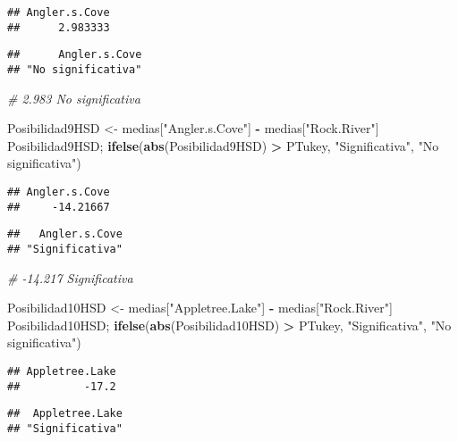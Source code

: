 \documentclass[
]{article}
\newenvironment{Shaded}{\begin{snugshade}}{\end{snugshade}}
\newcommand{\CommentTok}[1]{\textcolor[rgb]{0.56,0.35,0.01}{\textit{#1}}}
\newcommand{\FunctionTok}[1]{\textcolor[rgb]{0.13,0.29,0.53}{\textbf{#1}}}
\newcommand{\NormalTok}[1]{#1}
\newcommand{\OtherTok}[1]{\textcolor[rgb]{0.56,0.35,0.01}{#1}}
\newcommand{\SpecialCharTok}[1]{\textcolor[rgb]{0.81,0.36,0.00}{\textbf{#1}}}
\newcommand{\StringTok}[1]{\textcolor[rgb]{0.31,0.60,0.02}{#1}}
\begin{document}
\begin{verbatim}
## Angler.s.Cove 
##      2.983333
\end{verbatim}

\begin{verbatim}
##      Angler.s.Cove 
## "No significativa"
\end{verbatim}

\begin{Shaded}
\begin{Highlighting}[]
\CommentTok{\# 2.983 No significativa}

\NormalTok{Posibilidad9HSD }\OtherTok{\textless{}{-}}\NormalTok{ medias[}\StringTok{"Angler.s.Cove"}\NormalTok{] }\SpecialCharTok{{-}}\NormalTok{ medias[}\StringTok{"Rock.River"}\NormalTok{]}
\NormalTok{Posibilidad9HSD; }\FunctionTok{ifelse}\NormalTok{(}\FunctionTok{abs}\NormalTok{(Posibilidad9HSD) }\SpecialCharTok{\textgreater{}}\NormalTok{ PTukey, }\StringTok{"Significativa"}\NormalTok{, }\StringTok{"No significativa"}\NormalTok{)}
\end{Highlighting}
\end{Shaded}

\begin{verbatim}
## Angler.s.Cove 
##     -14.21667
\end{verbatim}

\begin{verbatim}
##   Angler.s.Cove 
## "Significativa"
\end{verbatim}

\begin{Shaded}
\begin{Highlighting}[]
\CommentTok{\# {-}14.217 Significativa}

\NormalTok{Posibilidad10HSD }\OtherTok{\textless{}{-}}\NormalTok{ medias[}\StringTok{"Appletree.Lake"}\NormalTok{] }\SpecialCharTok{{-}}\NormalTok{ medias[}\StringTok{"Rock.River"}\NormalTok{]}
\NormalTok{Posibilidad10HSD; }\FunctionTok{ifelse}\NormalTok{(}\FunctionTok{abs}\NormalTok{(Posibilidad10HSD) }\SpecialCharTok{\textgreater{}}\NormalTok{ PTukey, }\StringTok{"Significativa"}\NormalTok{, }\StringTok{"No significativa"}\NormalTok{)}
\end{Highlighting}
\end{Shaded}

\begin{verbatim}
## Appletree.Lake 
##          -17.2
\end{verbatim}

\begin{verbatim}
##  Appletree.Lake 
## "Significativa"
\end{verbatim}
\end{document}
